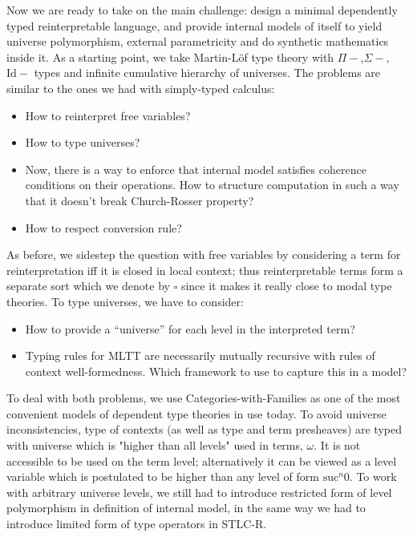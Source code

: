 \documentclass[acmsmall, review, screen, authorversion]{acmart}
\begin{document}
Now we are ready to take on the main challenge: design a minimal
dependently typed reinterpretable language, and provide internal
models of itself to yield universe polymorphism, external
parametricity and do synthetic mathematics inside it. As a starting
point, we take Martin-L\"of type theory with $\Pi-$,$\Sigma-$,
$\mathrm{Id}-$ types and infinite cumulative hierarchy of universes.
The problems are similar to the ones we had with simply-typed
calculus:

\begin{itemize}
    \item How to reinterpret free variables?
    \item How to type universes?
    \item Now, there is a way to enforce that internal model
        satisfies coherence conditions on their operations. How to
        structure computation in such a way that it doesn't break
        Church-Rosser property?
    \item How to respect conversion rule?
\end{itemize}

As before, we sidestep the question with free variables by
considering a term for reinterpretation iff it is closed in local
context; thus reinterpretable terms form a separate sort which we
denote by $\square$ since it makes it really close to modal type
theories. To type universes, we have to consider:

\begin{itemize}
    \item How to provide a ``universe'' for each level in the
        interpreted term?
    \item Typing rules for MLTT are necessarily mutually recursive
        with rules of context well-formedness. Which framework to use
        to capture this in a model?
\end{itemize}

To deal with both problems, we use Categories-with-Families
\cite{castellan2020cwf} as one of the most convenient models of
dependent type theories in use today. To avoid universe
inconsistencies, type of contexts (as well as type and term
presheaves) are typed with universe which is "higher than all levels"
used in terms, $\omega$. It is not accessible to be used on the term
level; alternatively it can be viewed as a level variable which is
postulated to be higher than any level of form $\mathrm{suc}^n 0$.
To work with arbitrary universe levels, we still had to introduce
restricted form of level polymorphism in definition of internal
model, in the same way we had to introduce limited form of type
operators in STLC-R.
\end{document}
